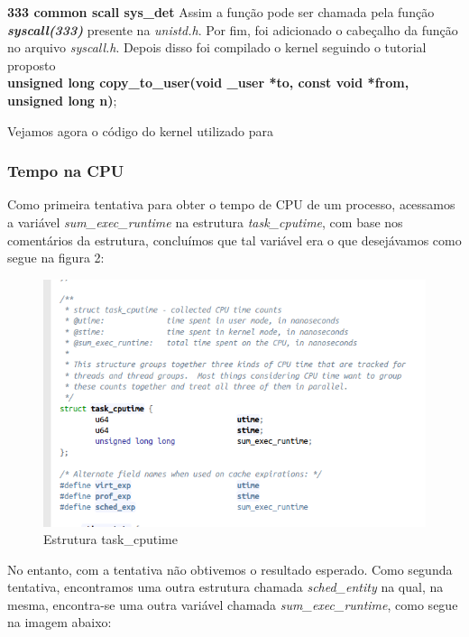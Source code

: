 \documentclass[12pt]{article}
\begin{document}
\textbf{333	common	scall			sys\_det}
\newline
Assim a função pode ser chamada pela função \textit{\textbf{syscall(333)}} presente na \textit{unistd.h}. Por fim, foi adicionado o cabeçalho da função no arquivo \textit{syscall.h}. Depois disso foi compilado o kernel seguindo o tutorial proposto  %
\\ \newline
\scriptsize{\textbf{unsigned long copy\_to\_user(void \_user *to, const void *from, unsigned long n)};}
\newline
	
Vejamos agora o código do kernel utilizado para

\subsubsection*{Tempo na CPU}
Como primeira tentativa para obter o tempo de CPU de um processo, acessamos a variável \textit{sum\_exec\_runtime} na estrutura \textit{task\_cputime}, com base nos comentários da estrutura, concluímos que tal variável era o que desejávamos como segue na figura 2: %

\begin{figure}[!h]
	\centering
	\includegraphics[scale=0.5]{imagens/img1.png}
	\caption{Estrutura task\_cputime}
	\label{taskcputime}
\end{figure}

No entanto, com a tentativa não obtivemos o resultado esperado.
Como segunda tentativa, encontramos uma outra estrutura chamada \textit{sched\_entity} na qual, na mesma, encontra-se uma outra variável chamada \textit{sum\_exec\_runtime}, como segue na imagem abaixo:
\end{document}

